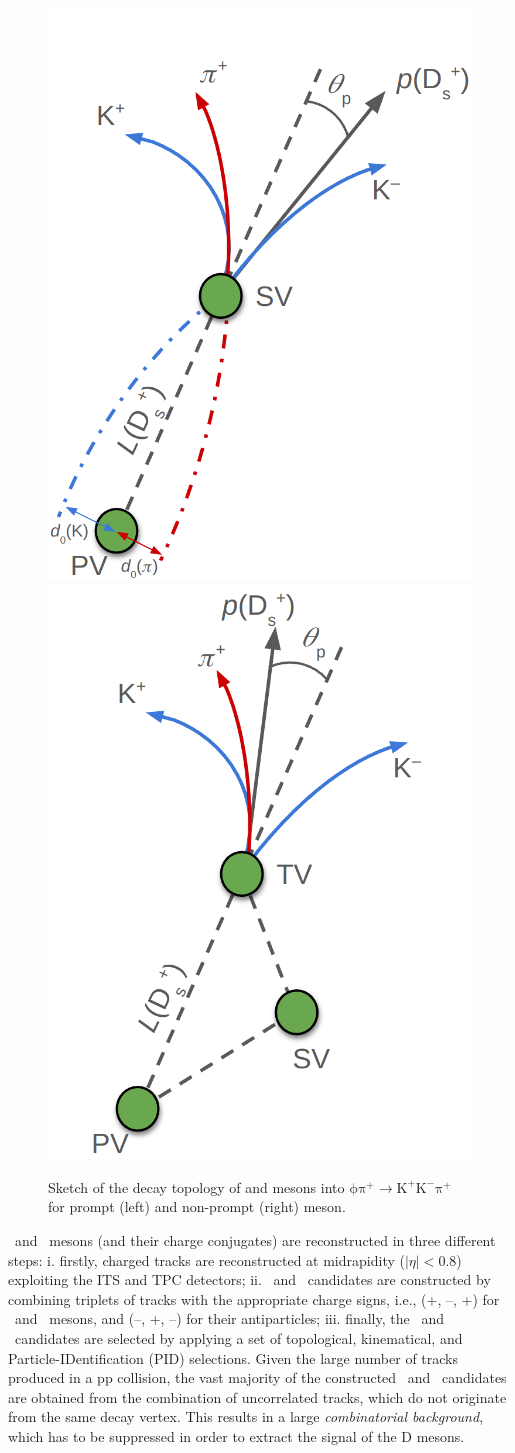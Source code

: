 \begin{figure}[htb]
    \centering
    \includegraphics[width=0.48\linewidth]{Figures/Chapter 4/sketchPrompt.png}
    \includegraphics[width=0.48\linewidth]{Figures/Chapter 4/sketchNonPrompt.png}
    \caption{Sketch of the decay topology of \ds and \dpl mesons into $\mathrm{\phi\pi^+ \rightarrow K^+K^-\pi^+}$ for prompt (left) and non-prompt (right) \ds meson.}
    \label{fig:DecaySketch}
\end{figure}

\ds\ and \dpl\ mesons (and their charge conjugates) are reconstructed in three different steps: i. firstly, charged tracks are reconstructed at midrapidity ($\lvert\eta\rvert < 0.8$) exploiting the ITS and TPC detectors; ii. \ds\ and \dpl\ candidates are constructed by combining triplets of tracks with the appropriate charge signs, i.e., (+, --, +) for \ds\ and \dpl\ mesons, and (--, +, --) for their antiparticles; iii. finally, the \ds\ and \dpl\ candidates are selected by applying a set of topological, kinematical, and Particle-IDentification (PID)  selections. Given the large number of tracks produced in a pp collision, the vast majority of the constructed \ds\ and \dpl\ candidates are obtained from the combination of uncorrelated tracks, which do not originate from the same decay vertex. This results in a large \emph{combinatorial background}, which has to be suppressed in order to extract the signal of the D mesons. 

